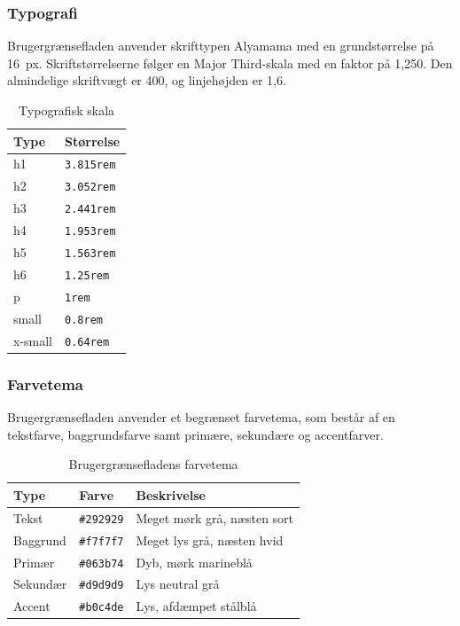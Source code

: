 \documentclass[a4paper, 11pt]{article}
\begin{document}
\subsubsection{Typografi}

Brugergrænsefladen anvender skrifttypen Alyamama med en grundstørrelse på 16~px.
Skriftstørrelserne følger en Major Third-skala med en faktor på 1,250. Den almindelige
skriftvægt er 400, og linjehøjden er 1,6.

\begin{table}[H]
  \centering
  \begin{tabular}{|l|l|}
    \hline
    \textbf{Type} & \textbf{Størrelse} \\
    \hline
    h1 & \texttt{3.815rem} \\
    h2 & \texttt{3.052rem} \\
    h3 & \texttt{2.441rem} \\
    h4 & \texttt{1.953rem} \\
    h5 & \texttt{1.563rem} \\
    h6 & \texttt{1.25rem} \\
    p & \texttt{1rem} \\
    small & \texttt{0.8rem} \\
    x-small & \texttt{0.64rem} \\
    \hline
  \end{tabular}
  \caption{Typografisk skala}
  \label{tab:typography}
\end{table}

\subsubsection{Farvetema}

Brugergrænsefladen anvender et begrænset farvetema, som består af en tekstfarve,
baggrundsfarve samt primære, sekundære og accentfarver.

\begin{table}[H]
  \centering
  \begin{tabular}{|l|l|p{7cm}|}
    \hline
    \textbf{Type} & \textbf{Farve} & \textbf{Beskrivelse} \\
    \hline
    Tekst & \texttt{\#292929} & Meget mørk grå, næsten sort \\
    Baggrund & \texttt{\#f7f7f7} & Meget lys grå, næsten hvid \\
    Primær & \texttt{\#063b74} & Dyb, mørk marineblå \\
    Sekundær & \texttt{\#d9d9d9} & Lys neutral grå \\
    Accent & \texttt{\#b0c4de} & Lys, afdæmpet stålblå \\
    \hline
  \end{tabular}
  \caption{Brugergrænsefladens farvetema}
  \label{tab:color_theme}
\end{table}
\end{document}
